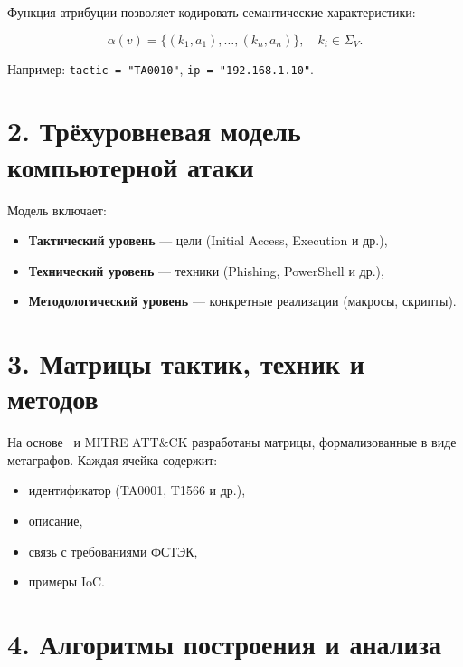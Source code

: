 \documentclass[12pt,a4paper]{article}
\begin{document}
Функция атрибуции позволяет кодировать семантические характеристики:

\begin{equation}
\alpha(v) = \{ (k_1, a_1), \dots, (k_n, a_n) \}, \quad k_i \in \Sigma_V.
\end{equation}

Например: \texttt{tactic = "TA0010"}, \texttt{ip = "192.168.1.10"}.

\section*{2. Трёхуровневая модель компьютерной атаки}


Модель включает:
\begin{itemize}
    \item \textbf{Тактический уровень} — цели (Initial Access, Execution и др.),
    \item \textbf{Технический уровень} — техники (Phishing, PowerShell и др.),
    \item \textbf{Методологический уровень} — конкретные реализации (макросы, скрипты).
\end{itemize}

\section*{3. Матрицы тактик, техник и методов}

На основе~\cite{latypov2020} и MITRE ATT\&CK разработаны матрицы, формализованные в виде метаграфов. Каждая ячейка содержит:
\begin{itemize}
    \item идентификатор (TA0001, T1566 и др.),
    \item описание,
    \item связь с требованиями ФСТЭК,
    \item примеры IoC.
\end{itemize}

\section*{4. Алгоритмы построения и анализа}
\end{document}
